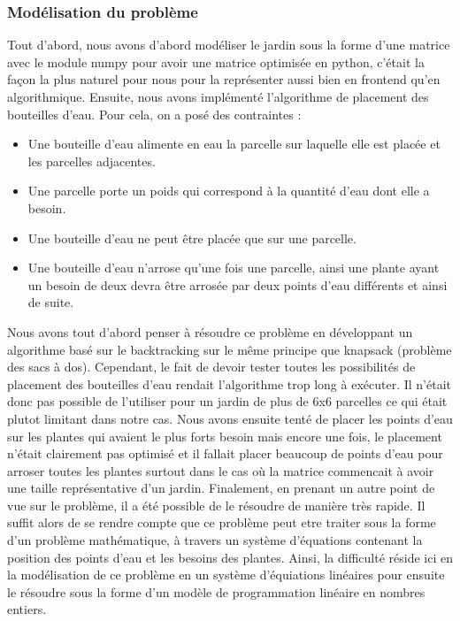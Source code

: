 \documentclass[french,a4paper]{article}
\begin{document}
\subsubsection{Modélisation du problème}
Tout d'abord, nous avons d'abord modéliser le jardin sous la forme d'une matrice avec le module numpy pour avoir une matrice optimisée en python, c'était la façon la plus naturel pour nous pour la représenter aussi bien en frontend qu'en algorithmique.
Ensuite, nous avons implémenté l'algorithme de placement des bouteilles d'eau. Pour cela, on a posé des contraintes :
\begin{itemize}
    \item Une bouteille d'eau alimente en eau la parcelle sur laquelle elle est placée et les parcelles adjacentes.
    \item Une parcelle porte un poids qui correspond à la quantité d'eau dont elle a besoin.
    \item Une bouteille d'eau ne peut être placée que sur une parcelle.
    \item Une bouteille d'eau n'arrose qu'une fois une parcelle, ainsi une plante ayant un besoin de deux devra être arrosée par deux points d'eau différents et ainsi de suite.
\end{itemize}
Nous avons tout d'abord penser à résoudre ce problème en développant un algorithme basé sur le backtracking sur le même principe que knapsack (problème des sacs à dos).
Cependant, le fait de devoir tester toutes les possibilités de placement des bouteilles d'eau rendait l'algorithme trop long à exécuter. Il n'était donc pas possible de l'utiliser pour un jardin de plus de 6x6 parcelles ce qui était plutot limitant dans notre cas.
Nous avons ensuite tenté de placer les points d'eau sur les plantes qui avaient le plus forts besoin mais encore une fois, le placement n'était clairement pas optimisé et il fallait placer beaucoup de points d'eau pour arroser toutes les plantes surtout dans le cas où la matrice commencait à avoir une taille représentative d'un jardin.
Finalement, en prenant un autre point de vue sur le problème, il a été possible de le résoudre de manière très rapide.
Il suffit alors de se rendre compte que ce problème peut etre traiter sous la forme d'un problème mathématique, à travers un système d'équations contenant la position des points d'eau et les besoins des plantes.
Ainsi, la difficulté réside ici en la modélisation de ce problème en un système d'équiations linéaires pour ensuite le résoudre sous la forme d'un modèle de programmation linéaire en nombres entiers.
\end{document}
